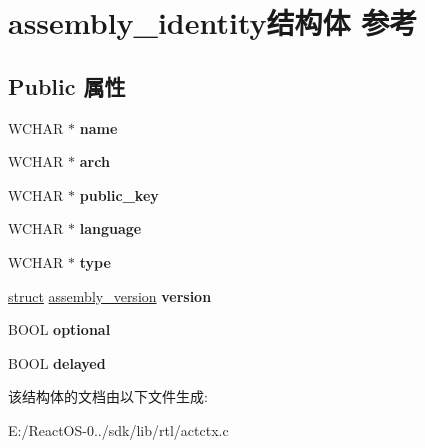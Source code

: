 \hypertarget{structassembly__identity}{}\section{assembly\+\_\+identity结构体 参考}
\label{structassembly__identity}
\subsection*{Public 属性}
\begin{DoxyCompactItemize}
\item 
\mbox{\label{structassembly__identity_a080c2bb2f0169df0183dc8babb083812}} 
W\+C\+H\+AR $\ast$ {\bfseries name}
\item 
\mbox{\label{structassembly__identity_a8d40e88dfd8b68670458b9dafb800b92}} 
W\+C\+H\+AR $\ast$ {\bfseries arch}
\item 
\mbox{\label{structassembly__identity_a457d24cfd55c5b6965a4d46fdf3715cb}} 
W\+C\+H\+AR $\ast$ {\bfseries public\+\_\+key}
\item 
\mbox{\label{structassembly__identity_a59b03c19e86937f87da8bf4cbede0dfc}} 
W\+C\+H\+AR $\ast$ {\bfseries language}
\item 
\mbox{\label{structassembly__identity_aa664fa58429a8a1bf83782e17e6c8df7}} 
W\+C\+H\+AR $\ast$ {\bfseries type}
\item 
\mbox{\label{structassembly__identity_accc474e5e73ce1c80ff4934d2e8ed428}} 
\hyperlink{interfacestruct}{struct} \hyperlink{structassembly__version}{assembly\+\_\+version} {\bfseries version}
\item 
\mbox{\label{structassembly__identity_aea593d18c0b230f066a4b9b716dec8c2}} 
B\+O\+OL {\bfseries optional}
\item 
\mbox{\label{structassembly__identity_ad146767b925fce481730e4e9bf0275d5}} 
B\+O\+OL {\bfseries delayed}
\end{DoxyCompactItemize}


该结构体的文档由以下文件生成\+:\begin{DoxyCompactItemize}
\item 
E\+:/\+React\+O\+S-\/0../sdk/lib/rtl/actctx.\+c\end{DoxyCompactItemize}
